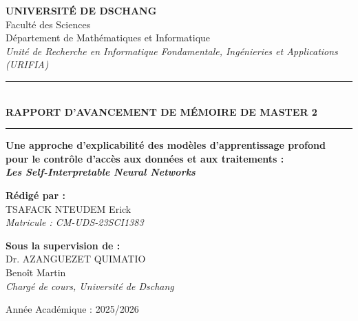 \documentclass[12pt,a4paper]{article}
\begin{document}
\begin{titlepage}
\thispagestyle{empty}
\begin{center}

\vspace*{0.5cm}
{\Large\bfseries\color{navyblue} UNIVERSIT\'E DE DSCHANG}\\[0.3cm]
{\normalsize Facult\'e des Sciences}\\[0.1cm]
{\normalsize D\'epartement de Math\'ematiques et Informatique}\\[0.1cm]
{\small\itshape Unit\'e de Recherche en Informatique Fondamentale, Ing\'enieries et Applications (URIFIA)}

\vspace{1.5cm}
\rule{\linewidth}{1.5pt}\\[0.4cm]
{\Large\bfseries\color{navyblue} RAPPORT D'AVANCEMENT DE M\'EMOIRE DE MASTER 2}\\[0.4cm]
\rule{\linewidth}{1.5pt}

\vspace{1.2cm}
{\Large\bfseries
Une approche d'explicabilit\'e des mod\`eles d'apprentissage profond\\[0.3cm]
pour le contr\^ole d'acc\`es aux donn\'ees et aux traitements :\\[0.3cm]
\textit{Les Self-Interpretable Neural Networks}}

\vspace{2cm}
\begin{minipage}{0.48\textwidth}
  \begin{flushleft}
    \textbf{R\'edig\'e par :}\\[0.2cm]
    TSAFACK NTEUDEM Erick\\
    \textit{Matricule : CM-UDS-23SCI1383}
  \end{flushleft}
\end{minipage}
\hfill
\begin{minipage}{0.48\textwidth}
  \begin{flushright}
    \textbf{Sous la supervision de :}\\[0.2cm]
    Dr. AZANGUEZET QUIMATIO\\
    Benoît Martin\\
    \textit{Charg\'e de cours, Universit\'e de Dschang}
  \end{flushright}
\end{minipage}

\vfill
{\normalsize Ann\'ee Acad\'emique : 2025/2026}

\end{center}
\end{titlepage}
\end{document}
